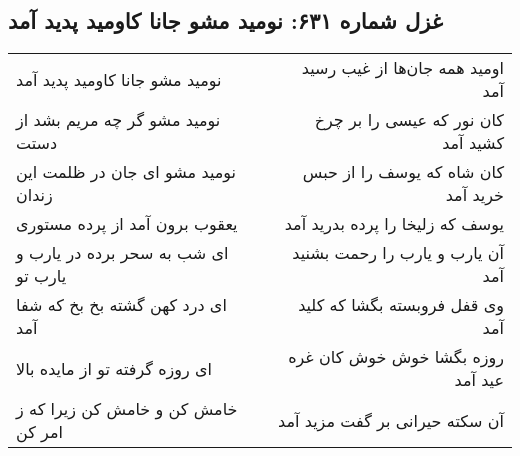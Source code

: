 \begin{center}
\section*{غزل شماره ۶۳۱: نومید مشو جانا کاومید پدید آمد}
\label{sec:0631}
\begin{longtable}{l p{0.5cm} r}
نومید مشو جانا کاومید پدید آمد
&&
اومید همه جان‌ها از غیب رسید آمد
\\
نومید مشو گر چه مریم بشد از دستت
&&
کان نور که عیسی را بر چرخ کشید آمد
\\
نومید مشو ای جان در ظلمت این زندان
&&
کان شاه که یوسف را از حبس خرید آمد
\\
یعقوب برون آمد از پرده مستوری
&&
یوسف که زلیخا را پرده بدرید آمد
\\
ای شب به سحر برده در یارب و یارب تو
&&
آن یارب و یارب را رحمت بشنید آمد
\\
ای درد کهن گشته بخ بخ که شفا آمد
&&
وی قفل فروبسته بگشا که کلید آمد
\\
ای روزه گرفته تو از مایده بالا
&&
روزه بگشا خوش خوش کان غره عید آمد
\\
خامش کن و خامش کن زیرا که ز امر کن
&&
آن سکته حیرانی بر گفت مزید آمد
\\
\end{longtable}
\end{center}
